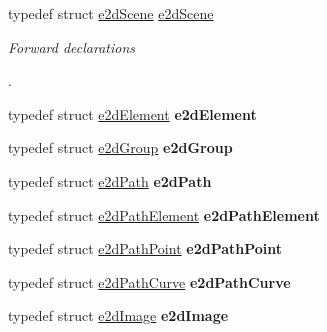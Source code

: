\begin{DoxyCompactItemize}
\item 
\hypertarget{group__Ez2DS_ga4663bede7d265bce67f2176cbe6d1f97}{typedef struct \hyperlink{structe2dScene}{e2d\-Scene} \hyperlink{group__Ez2DS_ga4663bede7d265bce67f2176cbe6d1f97}{e2d\-Scene}}\label{group__Ez2DS_ga4663bede7d265bce67f2176cbe6d1f97}

\begin{DoxyCompactList}\small\item\em Forward declarations \begin{DoxyVerb}  \end{DoxyVerb}
. \end{DoxyCompactList}\item 
\hypertarget{group__Ez2DS_ga7d730be997ced9a362d3fbde0c925029}{typedef struct \hyperlink{structe2dElement}{e2d\-Element} {\bfseries e2d\-Element}}\label{group__Ez2DS_ga7d730be997ced9a362d3fbde0c925029}

\item 
\hypertarget{group__Ez2DS_gaf3a345c79086b4c4a3bef68d54ec75bb}{typedef struct \hyperlink{structe2dGroup}{e2d\-Group} {\bfseries e2d\-Group}}\label{group__Ez2DS_gaf3a345c79086b4c4a3bef68d54ec75bb}

\item 
\hypertarget{group__Ez2DS_gae4c99476350936b6317aad7ddad92e87}{typedef struct \hyperlink{structe2dPath}{e2d\-Path} {\bfseries e2d\-Path}}\label{group__Ez2DS_gae4c99476350936b6317aad7ddad92e87}

\item 
\hypertarget{group__Ez2DS_gac6e31ed0b788ebe46ab4fe4e3f94f0e8}{typedef struct \hyperlink{structe2dPathElement}{e2d\-Path\-Element} {\bfseries e2d\-Path\-Element}}\label{group__Ez2DS_gac6e31ed0b788ebe46ab4fe4e3f94f0e8}

\item 
\hypertarget{group__Ez2DS_ga86cca845a62399e375916a400ce3f703}{typedef struct \hyperlink{structe2dPathPoint}{e2d\-Path\-Point} {\bfseries e2d\-Path\-Point}}\label{group__Ez2DS_ga86cca845a62399e375916a400ce3f703}

\item 
\hypertarget{group__Ez2DS_ga0ac56e0545e02476afb28cf4920751d9}{typedef struct \hyperlink{structe2dPathCurve}{e2d\-Path\-Curve} {\bfseries e2d\-Path\-Curve}}\label{group__Ez2DS_ga0ac56e0545e02476afb28cf4920751d9}

\item 
\hypertarget{group__Ez2DS_gaa743382cda21581102015f44280c875e}{typedef struct \hyperlink{structe2dImage}{e2d\-Image} {\bfseries e2d\-Image}}\label{group__Ez2DS_gaa743382cda21581102015f44280c875e}


\end{DoxyCompactItemize}
